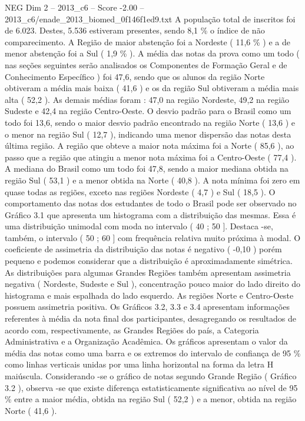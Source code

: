 \begin{textsample}{NEG Dim 2 – 2013\_c6 – Score -2.00 – 2013\_c6/enade\_2013\_biomed\_0f146f1ed9.txt}
A população total de inscritos foi de 6.023.
Destes, 5.536 estiveram presentes, sendo 8,1 \% o índice de não comparecimento.
A Região de maior abstenção foi a Nordeste ( 11,6 \% ) e a de menor abstenção foi a Sul ( 1,9 \% ).
A média das notas da prova como um todo ( nas seções seguintes serão analisados os Componentes de Formação Geral e de Conhecimento Específico ) foi 47,6, sendo que os alunos da região Norte obtiveram a média mais baixa ( 41,6 ) e os da região Sul obtiveram a média mais alta ( 52,2 ).
As demais médias foram : 47,0 na região Nordeste, 49,2 na região Sudeste e 42,4 na região Centro-Oeste.
O desvio padrão para o Brasil como um todo foi 13,6, sendo o maior desvio padrão encontrado na região Norte ( 13,6 ) e o menor na região Sul ( 12,7 ), indicando uma menor dispersão das notas desta última região.
A região que obteve a maior nota máxima foi a Norte ( 85,6 ), ao passo que a região que atingiu a menor nota máxima foi a Centro-Oeste ( 77,4 ).
A mediana do Brasil como um todo foi 47,8, sendo a maior mediana obtida na região Sul ( 53,1 ) e a menor obtida na Norte ( 40,8 ).
A nota mínima foi zero em quase todas as regiões, exceto nas regiões Nordeste ( 4,7 ) e Sul ( 18,5 ).
O comportamento das notas dos estudantes de todo o Brasil pode ser observado no Gráfico 3.1 que apresenta um histograma com a distribuição das mesmas.
Essa é uma distribuição unimodal com moda no intervalo ( 40 ; 50 ].
Destaca -se, também, o intervalo ( 50 ; 60 ] com frequência relativa muito próxima à modal.
O coeficiente de assimetria da distribuição das notas é negativo ( -0,10 ) porém pequeno e podemos considerar que a distribuição é aproximadamente simétrica.
As distribuições para algumas Grandes Regiões também apresentam assimetria negativa ( Nordeste, Sudeste e Sul ), concentração pouco maior do lado direito do histograma e mais espalhada do lado esquerdo.
As regiões Norte e Centro-Oeste possuem assimetria positiva.
Os Gráficos 3.2, 3.3 e 3.4 apresentam informações referentes à média da nota final dos participantes, desagregando os resultados de acordo com, respectivamente, as Grandes Regiões do país, a Categoria Administrativa e a Organização Acadêmica.
Os gráficos apresentam o valor da média das notas como uma barra e os extremos do intervalo de confiança de 95 \% como linhas verticais unidas por uma linha horizontal na forma da letra H maiúscula.
Considerando -se o gráfico de notas segundo Grande Região ( Gráfico 3.2 ), observa -se que existe diferença estatisticamente significativa ao nível de 95 \% entre a maior média, obtida na região Sul ( 52,2 ) e a menor, obtida na região Norte ( 41,6 ).

\end{textsample}
